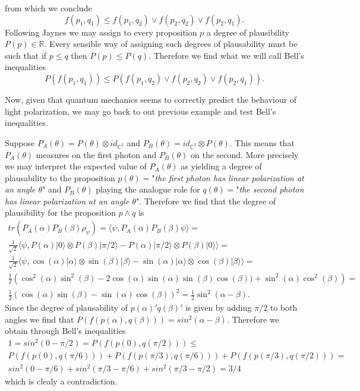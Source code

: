 from which we conclude 
\begin{equation}
f(p_1,q_1)\leq f(p_1,q_2)\vee f(p_2,q_2)\vee f(p_2,q_1). 
\end{equation}
Following Jaynes \cite{Jaynes2003} we may assign to every proposition $p$ a degree of plausibility $P(p)\in\mathbb{R}$. Every sensible way of assigning such degrees of plausability must be such that if $p\leq q$ then $P(p)\leq P(q)$. Therefore we find what we will call Bell's inequalities
\begin{equation}
P(f(p_1,q_1))\leq P(f(p_1,q_2)\vee f(p_2,q_2)\vee f(p_2,q_1)). 
\end{equation}

Now, given that quantum mechanics seems to correctly predict the behaviour of light polarization, we may go back to out previous example and test Bell's inequalities.
\begin{example}
Suppose $P_A(\theta)=P(\theta)\otimes id_{\mathbb{C}^2}$ and $P_B(\theta)=id_{\mathbb{C}^2}\otimes P(\theta)$. This means that $P_A(\theta)$ measures on the first photon and $P_B(\theta)$ on the second. More precisely we may interpret the expected value of $P_A(\theta)$ as yielding a degree of plausability to the proposition $p(\theta)=$"\textit{the first photon has linear polarization at an angle $\theta$}" and $P_B(\theta)$ playing the analogue role for $q(\theta)=$"\textit{the second photon has linear polarization at an angle $\theta$}". Therefore we find that the degree of plausibility for the proposition $p\wedge q$ is
\begin{multline}
tr(P_A(\alpha)P_B(\beta)\rho_\psi)= \langle \psi, P_A(\alpha)P_B(\beta)\psi\rangle= \\ \frac{1}{\sqrt{2}}\langle \psi, P(\alpha)|0\rangle\otimes P(\beta)|\pi/2\rangle -P(\alpha)|\pi/2\rangle\otimes P(\beta)|0\rangle\rangle= \\ \frac{1}{\sqrt{2}}\langle \psi, \cos(\alpha)|\alpha\rangle\otimes\sin(\beta)|\beta\rangle -\sin(\alpha)|\alpha\rangle\otimes\cos(\beta)|\beta\rangle\rangle= \\ \frac{1}{2}\left(\cos^2(\alpha)\sin^2(\beta)-2\cos(\alpha)\sin(\alpha)\sin(\beta)\cos(\beta))+\sin^2(\alpha)\cos^2(\beta)\right) = \\ \frac{1}{2}\left(\cos(\alpha)\sin(\beta)-\sin(\alpha)\cos(\beta)\right)^2 = \frac{1}{2}\sin^2(\alpha-\beta).
\end{multline}  				
Since the degree of plausability of $p(\alpha)'q(\beta)'$ is given by adding $\pi/2$ to both angles we find that $P(f(p(\alpha),q(\beta)))=sin^2(\alpha-\beta)$. Therefore we obtain through Bell's inequalities
\begin{multline}
1=sin^2(0-\pi/2)= P(f(p(0),q(\pi/2)))\leq \\ P(f(p(0),q(\pi/6)))+P(f(p(\pi/3),q(\pi/6)))+P(f(p(\pi/3),q(\pi/2))) = \\ sin^2(0-\pi/6) + sin^2(\pi/3-\pi/6) + sin^2(\pi/3-\pi/2) = 3/4
\end{multline}
which is clealy a contradiction.
\end{example}
